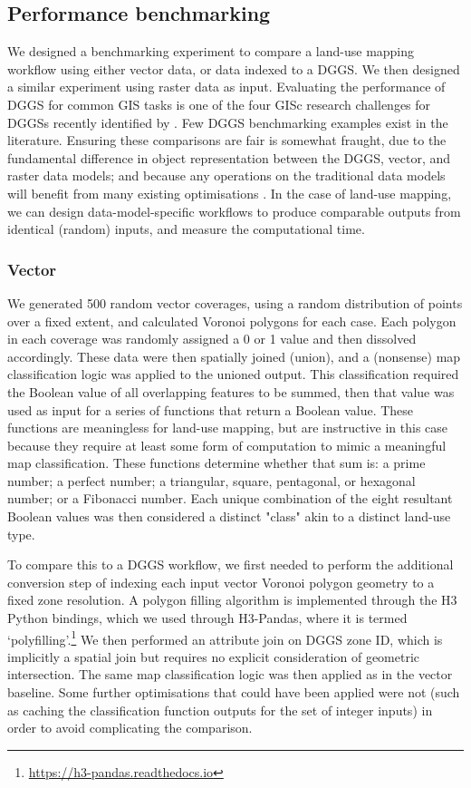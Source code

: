 \documentclass[]{interact}
\theoremstyle{plain}%
\theoremstyle{definition}
\theoremstyle{remark}
\begin{document}
\subsection{Performance benchmarking}

We designed a benchmarking experiment to compare a land-use mapping workflow using either vector data, or data indexed to a \ac{DGGS}. We then designed a similar experiment using raster data as input. Evaluating the performance of \ac{DGGS} for common \ac{GIS} tasks is one of the four \ac{GISc} research challenges for \acp{DGGS} recently identified by \citet{hojati2022giscience}. Few \ac{DGGS} benchmarking examples exist in the literature. Ensuring these comparisons are fair is somewhat fraught, due to the fundamental difference in object representation between the DGGS, vector, and raster data models; and because any operations on the traditional data models will benefit from many existing optimisations \citep{hojati2022giscience}. In the case of land-use mapping, we can design data-model-specific workflows to produce comparable outputs from identical (random) inputs, and measure the computational time.

\subsubsection{Vector}

We generated 500 random vector coverages, using a random distribution of points over a fixed extent, and calculated Voronoi polygons for each case. Each polygon in each coverage was randomly assigned a 0 or 1 value and then dissolved accordingly. These data were then spatially joined (union), and a (nonsense) map classification logic was applied to the unioned output. This classification required the Boolean value of all overlapping features to be summed, then that value was used as input for a series of functions that return a Boolean value. These functions are meaningless for land-use mapping, but are instructive in this case because they require at least some form of computation to mimic a meaningful map classification. These functions determine whether that sum is: a prime number; a perfect number; a triangular, square, pentagonal, or hexagonal number; or a Fibonacci number. Each unique combination of the eight resultant Boolean values was then considered a distinct "class" akin to a distinct land-use type.

To compare this to a \ac{DGGS} workflow, we first needed to perform the additional conversion step of indexing each input vector Voronoi polygon geometry to a fixed zone resolution. A polygon filling algorithm is implemented through the H3 Python bindings, which we used through H3-Pandas, where it is termed `polyfilling'.\footnote{\url{https://h3-pandas.readthedocs.io}} We then performed an attribute join on \ac{DGGS} zone ID, which is implicitly a spatial join but requires no explicit consideration of geometric intersection. The same map classification logic was then applied as in the vector baseline. Some further optimisations that could have been applied were not (such as caching the classification function outputs for the set of integer inputs) in order to avoid complicating the comparison.
\end{document}
